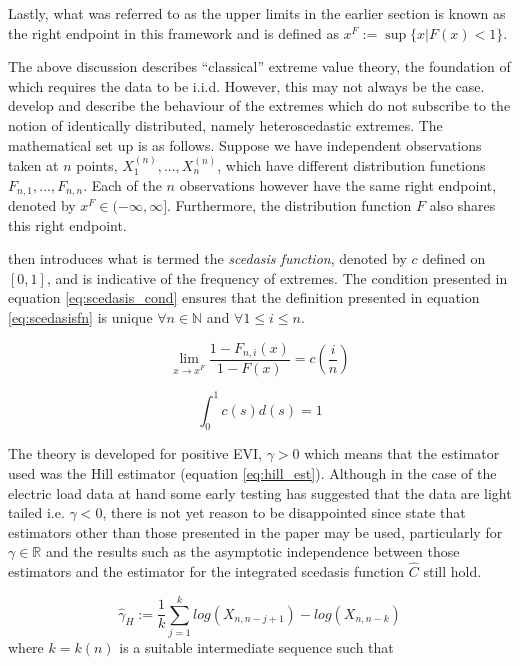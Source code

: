 \documentclass[a4paper]{article}
\begin{document}
Lastly, what was referred to as the upper limits in the earlier section is known as the right endpoint in this framework and is defined as $x^F := \sup\{x | F(x) < 1\}$.

The above discussion describes ``classical'' extreme value theory, the foundation of which requires the data to be i.i.d. However, this may not always be the case. \cite{einmahl16} develop and describe the behaviour of the extremes which do not subscribe to the notion of identically distributed, namely heteroscedastic extremes. The mathematical set up is as follows. Suppose we have independent observations taken at $n$ points, $X_1^{(n)} , ... , X_n^{(n)}$, which have different distribution functions $F_{n,1}, ... , F_{n,n}$. Each of the $n$ observations however have the same right endpoint, denoted by $x^F \in (-\infty, \infty]$. Furthermore, the distribution function $F$ also shares this right endpoint.

\cite{einmahl16} then introduces what is termed the \textit{scedasis function}, denoted by $c$ defined on $[0,1]$, and is indicative of the frequency of extremes. The condition presented in equation \ref{eq:scedasis_cond} ensures that the definition presented in equation \ref{eq:scedasisfn} is unique $\forall n \in \mathbb{N}$ and $\forall 1 \le i \le n$.

\begin{equation} \label{eq:scedasisfn}
\lim_{x \rightarrow x^F} \frac{1-F_{n,i}(x)}{1 - F(x)} = c(\frac{i}{n})
\end{equation}

\begin{equation} \label{eq:scedasis_cond}
\int_0^1 c(s)d(s) = 1
\end{equation}

The theory is developed for positive EVI, $\gamma > 0 $ which means that the estimator used was the Hill estimator (equation \ref{eq:hill_est}). Although in the case of the electric load data at hand some early testing has suggested that the data are light tailed i.e. $\gamma < 0 $, there is not yet reason to be disappointed since \cite{einmahl16} state that estimators other than those presented in the paper may be used, particularly for $\gamma \in \mathbb{R}$ and the results such as the asymptotic independence between those estimators and the estimator for the integrated scedasis function $\hat{C}$ still hold.

\begin{equation} \label{eq:hill_est}
\hat{\gamma}_H := \frac{1}{k} \sum_{j=1}^k log(X_{n,n-j+1}) - log(X_{n,n-k})
\end{equation}
where $k=k(n)$ is a suitable intermediate sequence such that 
\end{document}
